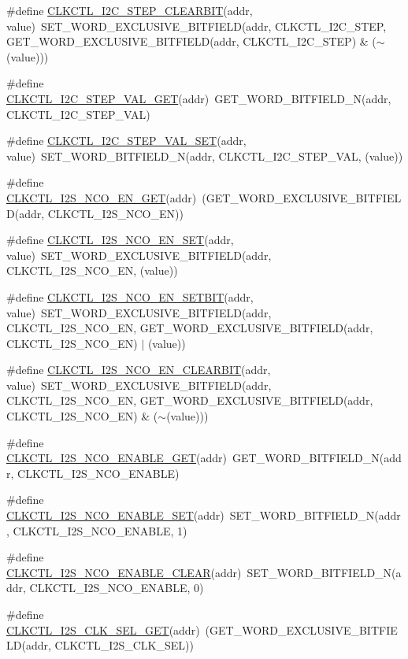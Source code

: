 \begin{DoxyCompactItemize}
\item 
\#define \hyperlink{a00544_a68eb2f22f767c82ddc7d8e477a6e7bbd}{CLKCTL\_\-I2C\_\-STEP\_\-CLEARBIT}(addr, value)~SET\_\-WORD\_\-EXCLUSIVE\_\-BITFIELD(addr, CLKCTL\_\-I2C\_\-STEP, GET\_\-WORD\_\-EXCLUSIVE\_\-BITFIELD(addr, CLKCTL\_\-I2C\_\-STEP) \& ($\sim$(value)))
\item 
\#define \hyperlink{a00544_aaaef44b80f37ecf9306fef6f7280a5e5}{CLKCTL\_\-I2C\_\-STEP\_\-VAL\_\-GET}(addr)~GET\_\-WORD\_\-BITFIELD\_\-N(addr, CLKCTL\_\-I2C\_\-STEP\_\-VAL)
\item 
\#define \hyperlink{a00544_a2c4fc3761a7a7ee24557746dbde229b9}{CLKCTL\_\-I2C\_\-STEP\_\-VAL\_\-SET}(addr, value)~SET\_\-WORD\_\-BITFIELD\_\-N(addr, CLKCTL\_\-I2C\_\-STEP\_\-VAL, (value))
\item 
\#define \hyperlink{a00544_a24287add3b48c8bb0edf58d923f06d57}{CLKCTL\_\-I2S\_\-NCO\_\-EN\_\-GET}(addr)~(GET\_\-WORD\_\-EXCLUSIVE\_\-BITFIELD(addr, CLKCTL\_\-I2S\_\-NCO\_\-EN))
\item 
\#define \hyperlink{a00544_affcf89200591f47dab298e77752fb32c}{CLKCTL\_\-I2S\_\-NCO\_\-EN\_\-SET}(addr, value)~SET\_\-WORD\_\-EXCLUSIVE\_\-BITFIELD(addr, CLKCTL\_\-I2S\_\-NCO\_\-EN, (value))
\item 
\#define \hyperlink{a00544_a1d2db9a25fd58f07ba0567d8a9f1369b}{CLKCTL\_\-I2S\_\-NCO\_\-EN\_\-SETBIT}(addr, value)~SET\_\-WORD\_\-EXCLUSIVE\_\-BITFIELD(addr, CLKCTL\_\-I2S\_\-NCO\_\-EN, GET\_\-WORD\_\-EXCLUSIVE\_\-BITFIELD(addr, CLKCTL\_\-I2S\_\-NCO\_\-EN) $|$ (value))
\item 
\#define \hyperlink{a00544_a43ec849a354564015cd4ecd081767ef6}{CLKCTL\_\-I2S\_\-NCO\_\-EN\_\-CLEARBIT}(addr, value)~SET\_\-WORD\_\-EXCLUSIVE\_\-BITFIELD(addr, CLKCTL\_\-I2S\_\-NCO\_\-EN, GET\_\-WORD\_\-EXCLUSIVE\_\-BITFIELD(addr, CLKCTL\_\-I2S\_\-NCO\_\-EN) \& ($\sim$(value)))
\item 
\#define \hyperlink{a00544_ade4d4a69d74c8f36e29abeb9a2b0759d}{CLKCTL\_\-I2S\_\-NCO\_\-ENABLE\_\-GET}(addr)~GET\_\-WORD\_\-BITFIELD\_\-N(addr, CLKCTL\_\-I2S\_\-NCO\_\-ENABLE)
\item 
\#define \hyperlink{a00544_a312a4793621129507a5671c301949394}{CLKCTL\_\-I2S\_\-NCO\_\-ENABLE\_\-SET}(addr)~SET\_\-WORD\_\-BITFIELD\_\-N(addr, CLKCTL\_\-I2S\_\-NCO\_\-ENABLE, 1)
\item 
\#define \hyperlink{a00544_a2c3fe9199f330a373994ad058c13f56f}{CLKCTL\_\-I2S\_\-NCO\_\-ENABLE\_\-CLEAR}(addr)~SET\_\-WORD\_\-BITFIELD\_\-N(addr, CLKCTL\_\-I2S\_\-NCO\_\-ENABLE, 0)
\item 
\#define \hyperlink{a00544_a38a02a90bfca6e3c5606847d4a73597b}{CLKCTL\_\-I2S\_\-CLK\_\-SEL\_\-GET}(addr)~(GET\_\-WORD\_\-EXCLUSIVE\_\-BITFIELD(addr, CLKCTL\_\-I2S\_\-CLK\_\-SEL))

\end{DoxyCompactItemize}
